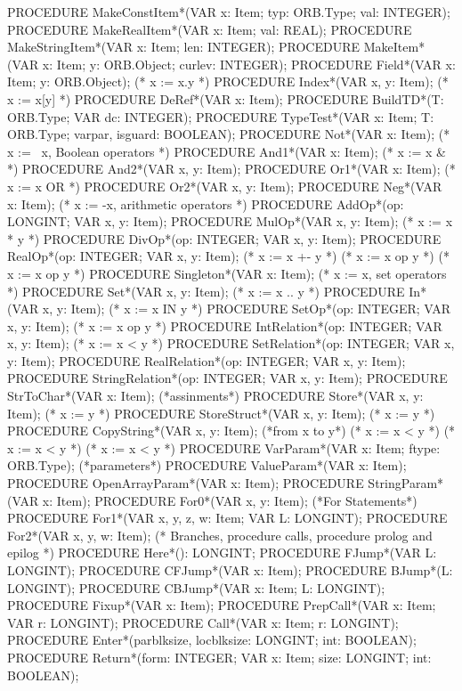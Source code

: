   PROCEDURE MakeConstItem*(VAR x: Item; typ: ORB.Type; val: INTEGER);
  PROCEDURE MakeRealItem*(VAR x: Item; val: REAL);
  PROCEDURE MakeStringItem*(VAR x: Item; len: INTEGER);
  PROCEDURE MakeItem*(VAR x: Item; y: ORB.Object; curlev: INTEGER);
  PROCEDURE Field*(VAR x: Item; y: ORB.Object); (* x := x.y *)
  PROCEDURE Index*(VAR x, y: Item); (* x := x[y] *)
  PROCEDURE DeRef*(VAR x: Item);
  PROCEDURE BuildTD*(T: ORB.Type; VAR dc: INTEGER);
  PROCEDURE TypeTest*(VAR x: Item; T: ORB.Type; varpar, isguard: BOOLEAN);
  PROCEDURE Not*(VAR x: Item); (* x := ~x, Boolean operators *)
  PROCEDURE And1*(VAR x: Item); (* x := x & *)
  PROCEDURE And2*(VAR x, y: Item);
  PROCEDURE Or1*(VAR x: Item); (* x := x OR *)
  PROCEDURE Or2*(VAR x, y: Item);
  PROCEDURE Neg*(VAR x: Item); (* x := -x, arithmetic operators *)
  PROCEDURE AddOp*(op: LONGINT; VAR x, y: Item);
  PROCEDURE MulOp*(VAR x, y: Item); (* x := x * y *)
  PROCEDURE DivOp*(op: INTEGER; VAR x, y: Item);
  PROCEDURE RealOp*(op: INTEGER; VAR x, y: Item);
  (* x := x +- y *)
  (* x := x op y *) (* x := x op y *)
  PROCEDURE Singleton*(VAR x: Item); (* x := {x}, set operators *)
  PROCEDURE Set*(VAR x, y: Item); (* x := {x .. y} *)
  PROCEDURE In*(VAR x, y: Item); (* x := x IN y *)
  PROCEDURE SetOp*(op: INTEGER; VAR x, y: Item); (* x := x op y *)
  PROCEDURE IntRelation*(op: INTEGER; VAR x, y: Item); (* x := x < y *)
  PROCEDURE SetRelation*(op: INTEGER; VAR x, y: Item);
  PROCEDURE RealRelation*(op: INTEGER; VAR x, y: Item);
  PROCEDURE StringRelation*(op: INTEGER; VAR x, y: Item);
  PROCEDURE StrToChar*(VAR x: Item); (*assinments*)
  PROCEDURE Store*(VAR x, y: Item); (* x := y *)
  PROCEDURE StoreStruct*(VAR x, y: Item); (* x := y *)
  PROCEDURE CopyString*(VAR x, y: Item); (*from x to y*)
  (* x := x < y *) (* x := x < y *)
  (* x := x < y *)
  PROCEDURE VarParam*(VAR x: Item; ftype: ORB.Type); (*parameters*)
  PROCEDURE ValueParam*(VAR x: Item);
  PROCEDURE OpenArrayParam*(VAR x: Item);
  PROCEDURE StringParam*(VAR x: Item);
  PROCEDURE For0*(VAR x, y: Item); (*For Statements*)
  PROCEDURE For1*(VAR x, y, z, w: Item; VAR L: LONGINT);
  PROCEDURE For2*(VAR x, y, w: Item);
  (* Branches, procedure calls, procedure prolog and epilog *)
  PROCEDURE Here*(): LONGINT;
  PROCEDURE FJump*(VAR L: LONGINT);
  PROCEDURE CFJump*(VAR x: Item);
  PROCEDURE BJump*(L: LONGINT);
  PROCEDURE CBJump*(VAR x: Item; L: LONGINT);
  PROCEDURE Fixup*(VAR x: Item);
  PROCEDURE PrepCall*(VAR x: Item; VAR r: LONGINT);
  PROCEDURE Call*(VAR x: Item; r: LONGINT);
  PROCEDURE Enter*(parblksize, locblksize: LONGINT; int: BOOLEAN);
  PROCEDURE Return*(form: INTEGER; VAR x: Item; size: LONGINT; int: BOOLEAN);
